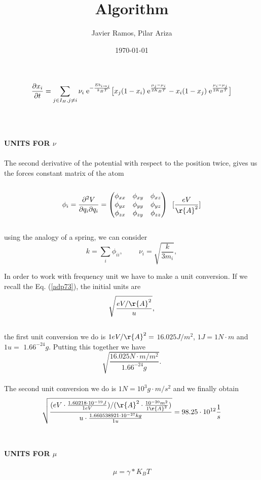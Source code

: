 \documentclass{article}
\title{Algorithm} %
\author{Javier Ramos, Pilar Ariza} %
\date{\today} %
\begin{document}
\begin{equation}
    \frac{\partial x_i}{\partial t} = \sum_{j \in I_H,j \neq i}\nu_i  \; {\rm e}^{ -\frac{Eb_{i\rightarrow j}}{k_BT}} \big[ x_j(1-x_i)\;{\rm e}^{\frac{\mu_j-\mu_i}{2K_BT}} - x_i(1-x_j)\;{\rm e}^{\frac{\mu_i-\mu_j}{2K_BT}} \big]
\end{equation}
\\ \\ \\
\textbf{UNITS FOR $\nu$} 
\\ \\
The second derivative of the potential with respect to the position twice, gives us the forces constant matrix of the atom \\ \\ 
 \begin{equation}\label{adp72}
 \phi_i=\frac{\partial^2 V}{\partial q_i \partial q_i} = 
     \begin{pmatrix}
\phi_{xx} & \phi_{xy} & \phi_{xz}\\
\phi_{yx} & \phi_{yy} & \phi_{yz}\\
\phi_{zx} & \phi_{zy} & \phi_{zz}
\end{pmatrix}\;\;[\frac{eV}{\r{A}^2}]
 \end{equation}
 \\
using the analogy of a spring, we can consider
\\
\begin{equation}\label{adp73}
    k=\sum_i \phi_{ii}, \; \;\; \;\; \;\; \;  \nu_i=\sqrt{\frac{k}{3m_i}},
\end{equation}

In order to work with frequency unit we have to make a unit conversion. If we recall the Eq. (\ref{adp73}), the initial units are
\\
\begin{equation} \label{adp80}
    \sqrt{\frac{eV/\r{A}^2}{u}},
\end{equation}
\\
the first unit conversion we do is $1 eV/\r{A}^2 =$ $16.025 J/m^2 $, $1J = 1 N \cdot m$ and $1 u = $ $1.66^{-24}g$. Putting this together we have
\\
\begin{equation}\label{adp81}
    \sqrt{\frac{16.025 N \cdot m/{m}^2}{1.66^{-24}g}}.
\end{equation}
\\
The second unit conversion we do is $1N = 10^3 g \cdot m /s^2$ and we finally obtain
\\
\begin{equation}\label{adp82}
    \sqrt{\frac{(eV\cdot \frac{1.60218 \cdot 10^{-19}J}{1 eV}) /(\r{A}^2 \cdot \frac{10^{-20}m^2}{1 \r{A}^2})}{u \cdot \frac{1.660538921 \cdot 10^{-27} kg}{1 u}}} = 98.25 \cdot 10^{12} \frac{1}{s} 
\end{equation}
\\ \\
\textbf{UNITS FOR $\mu$} 
\\ \\
\begin{equation}\label{mu}
    \mu = \gamma * K_BT
\end{equation}
\end{document}
